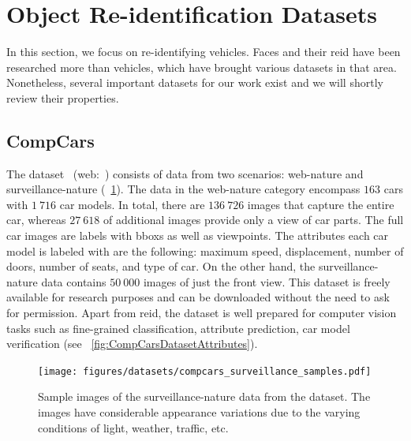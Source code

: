 \section{Object Re-identification Datasets}
\label{sec:ObjectReIDDatasets}

In this section, we focus on re-identifying vehicles. Faces and their \gls{reid} have been researched more than vehicles, which have brought various datasets in that area. Nonetheless, several important datasets for our work exist and we will shortly review their properties.

\subsection{CompCars}
\label{ssec:DatasetCompCars}

The  dataset~\cite{yang2015compcars} (web:~\cite{webcompcarsdataset}) consists of data from two scenarios: web-nature and surveillance-nature (\figstr{}~\ref{fig:CompCarsDatasetSurveillance}). The data in the web-nature category encompass $163$ cars with $1\ 716$ car models. In total, there are $136\ 726$ images that capture the entire car, whereas $27\ 618$ of additional images provide only a view of car parts. The full car images are labels with \glspl{bbox} as well as viewpoints. The attributes each car model is labeled with are the following: maximum speed, displacement, number of doors, number of seats, and type of car. On the other hand, the surveillance-nature data contains $50\ 000$ images of just the front view. This dataset is freely available for research purposes and can be downloaded without the need to ask for permission. Apart from \gls{reid}, the dataset is well prepared for computer vision tasks such as fine-grained classification, attribute prediction, car model verification (see \figstr{}~\ref{fig:CompCarsDatasetAttributes}).

\begin{figure}[t]
    \centerline{\texttt{[image: figures/datasets/compcars\_surveillance\_samples.pdf]}}
    \caption[ dataset]{Sample images of the surveillance-nature data from the  dataset. The images have considerable appearance variations due to the varying conditions of light, weather, traffic, etc. }
    \label{fig:CompCarsDatasetSurveillance}
\end{figure}

